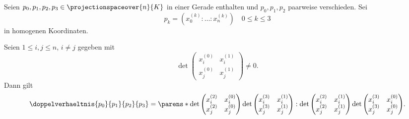 \begin{lemma}
  Seien \( p_0,p_1,p_2,p_3\in \projectionspaceover{n}{K} \) in einer Gerade enthalten und \( p_0,p_1,p_2 \) paarweise verschieden. Sei
  \begin{equation*}
    p_k=(x_0^{(k)}:\dotsc:x_n^{(k)})\quad 0\leq k\leq 3
  \end{equation*}
  in homogenen Koordinaten.

  Seien \( 1\leq i,j\leq n \), \( i\neq j \) gegeben mit
  \begin{equation*}
    \det \begin{pmatrix} x_i^{(0)} & x_i^{(1)} \\ x_j^{(0)} & x_j^{(1)} \end{pmatrix}\neq 0.
  \end{equation*}
  Dann gilt
  \begin{equation*}
    \doppelverhaeltnis{p_0}{p_1}{p_2}{p_3}=\parens*{\det \begin{pmatrix} x_i^{(2)} & x_i^{(0)} \\ x_j^{(2)} & x_j^{(0)} \end{pmatrix}\det \begin{pmatrix} x_i^{(3)} & x_i^{(1)} \\ x_j^{(3)} & x_j^{(1)} \end{pmatrix}:\det \begin{pmatrix} x_i^{(2)} & x_i^{(1)} \\ x_j^{(2)} & x_j^{(1)} \end{pmatrix}\det \begin{pmatrix} x_i^{(3)} & x_i^{(0)} \\ x_j^{(3)} & x_j^{(0)} \end{pmatrix}}.
  \end{equation*}
\end{lemma}
